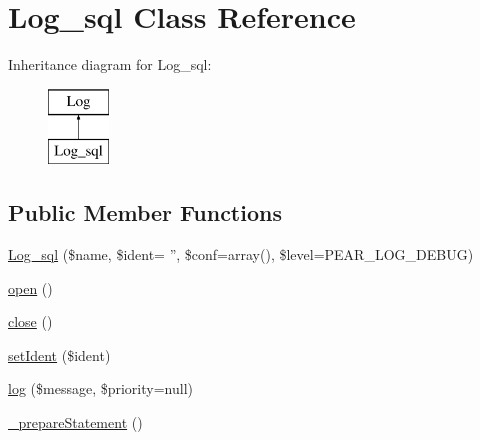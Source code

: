 \hypertarget{class_log__sql}{
\section{Log\_\-sql Class Reference}
\label{class_log__sql}
}
Inheritance diagram for Log\_\-sql:\begin{figure}[H]
\begin{center}
\leavevmode
\includegraphics[height=2.000000cm]{class_log__sql}
\end{center}
\end{figure}
\subsection*{Public Member Functions}
\begin{DoxyCompactItemize}
\item 
\hyperlink{class_log__sql_a2693b5c00bb3aa4c159687b2305a6b7e}{Log\_\-sql} (\$name, \$ident= '', \$conf=array(), \$level=PEAR\_\-LOG\_\-DEBUG)
\item 
\hyperlink{class_log__sql_a44a2ac59a3b91f8c18905dce700934d6}{open} ()
\item 
\hyperlink{class_log__sql_aa69c8bf1f1dcf4e72552efff1fe3e87e}{close} ()
\item 
\hyperlink{class_log__sql_a9d8352d257344340d7a5b9c081d2a0d9}{setIdent} (\$ident)
\item 
\hyperlink{class_log__sql_ac3758dfa38a67df158a446847cf06413}{log} (\$message, \$priority=null)
\item 
\hyperlink{class_log__sql_afdc936abae49f02ed9157385c9dd10c4}{\_\-prepareStatement} ()
\end{DoxyCompactItemize}
